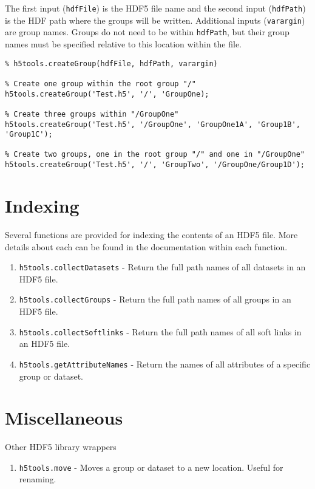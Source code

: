 \documentclass[11pt]{exam}
\newcommand\myfcn[1]{\colorbox{codegray}{\textcolor{codeblue}{\texttt{#1}}}}
\begin{document}
        The first input (\texttt{hdfFile}) is the HDF5 file name and the second input (\texttt{hdfPath}) is the HDF path where the groups will be written. Additional inputs (\texttt{varargin}) are group names. Groups do not need to be within \texttt{hdfPath}, but their group names must be specified relative to this location within the file. 
		\begin{lstlisting}[style=matlab-editor, basicstyle=\mlttfamily\footnotesize]
% SYNTAX
% h5tools.createGroup(hdfFile, hdfPath, varargin)

% Create one group within the root group "/"
h5tools.createGroup('Test.h5', '/', 'GroupOne);

% Create three groups within "/GroupOne"
h5tools.createGroup('Test.h5', '/GroupOne', 'GroupOne1A', 'Group1B', 'Group1C');

% Create two groups, one in the root group "/" and one in "/GroupOne"
h5tools.createGroup('Test.h5', '/', 'GroupTwo', '/GroupOne/Group1D');
		\end{lstlisting}
		

    \section{Indexing}
    \noindent Several functions are provided for indexing the contents of an HDF5 file. More details about each can be found in the documentation within each function.
    \begin{enumerate}
        \item \myfcn{h5tools.collectDatasets} - Return the full path names of all datasets in an HDF5 file. 
        \item \myfcn{h5tools.collectGroups} - Return the full path names of all groups in an HDF5 file. 
        \item \myfcn{h5tools.collectSoftlinks} - Return the full path names of all soft links in an HDF5 file. 
        \item \myfcn{h5tools.getAttributeNames} - Return the names of all attributes of a specific group or dataset. 
    \end{enumerate}

    \section{Miscellaneous}
    \noindent Other HDF5 library wrappers
    \begin{enumerate}
        \item \myfcn{h5tools.move} - Moves a group or dataset to a new location. Useful for renaming.
    \end{enumerate}
\end{document}
